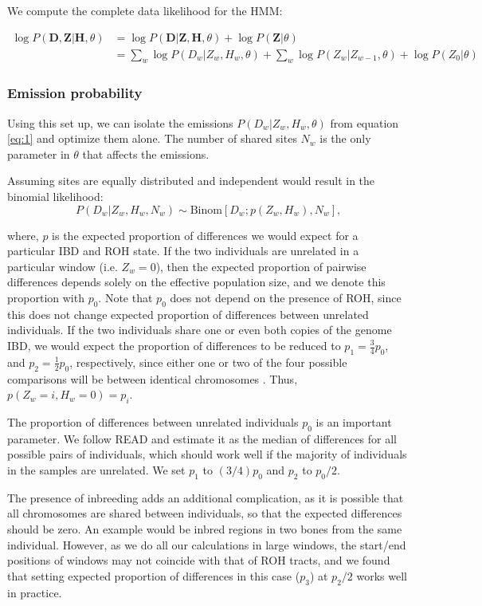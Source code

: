 \documentclass[12pt, letterpaper]{article}
\newcommand{\BZ}{\mathbf{Z}}
\newcommand{\BD}{\mathbf{D}}
\newcommand{\BH}{\mathbf{H}}
\begin{document}
We compute the complete data likelihood for the HMM:

\begin{align}\label{eq:1}
\log P(\BD,\BZ|\BH, \theta) &= \log P(\BD|\BZ,\BH, \theta) + \log P(\BZ |\theta) \nonumber\\
&= \sum_w \log P(D_w|Z_w,H_w, \theta) + \sum_w \log P(Z_w |Z_{w-1},\theta) + \log P(Z_0|\theta)
\end{align}

\subsubsection{Emission probability}
Using this set up, we can isolate the emissions $P(D_w | Z_w, H_w ,\theta)$ from equation \ref{eq:1} and optimize them alone. The number of shared sites $N_w$ is the only parameter in $\theta$ that affects the emissions. 

Assuming sites are equally distributed and independent would result in the binomial likelihood:
$$P(D_w|Z_w, H_w, N_w) \sim \text{Binom}[D_w ; p(Z_w, H_w), N_w] \text{,}$$

where, $p$ is the expected proportion of differences we would expect for a particular IBD and ROH state. If the two individuals are unrelated in a particular window (i.e. $Z_w = 0$), then the expected proportion of pairwise differences depends solely on the effective population size, and we denote this proportion with $p_0$. Note that $p_0$ does not depend on the presence of ROH, since this does not change expected proportion of differences between unrelated individuals. If the two individuals share one or even both copies of the genome IBD, we would expect the proportion of differences to be reduced to $p_1 = \frac{3}{4} p_0$, and $p_2 = \frac{1}2 p_0$, respectively, since either one or two of the four possible comparisons will be between identical chromosomes \cite{kuhn_estimating_2018}. Thus, $p(Z_w=i, H_w=0) = p_i$.

The proportion of differences between unrelated individuals $p_0$ is an important parameter. We follow READ \cite{kuhn_estimating_2018} and estimate it as the median of differences for all possible pairs of individuals, which should work well if the majority of individuals in the samples are unrelated. We set $p_1$ to $(3/4)p_0$ and $p_2$ to $p_0/2$. 

The presence of inbreeding adds an additional complication, as it is possible that all chromosomes are shared between individuals, so that the expected differences should be zero. An example would be inbred regions in two bones from the same individual. However, as we do all our calculations in large windows, the start/end positions of windows may not coincide with that of ROH tracts, and we found that setting expected proportion of differences in this case ($p_3$) at $p_2/2$ works well in practice.
\end{document}
